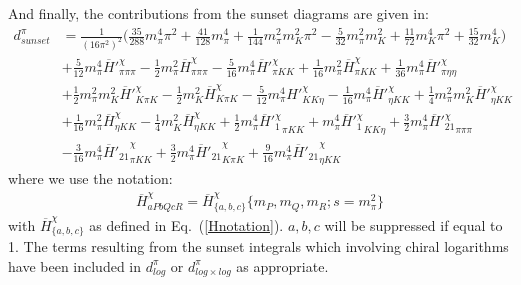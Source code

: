 \documentclass[12pt,a4paper]{article}
\begin{document}
And finally, the contributions from the sunset diagrams are given in:
\begin{align}
	{d}^{\pi}_{sunset} & = \frac{1}{(16\pi^2)^2} \bigg( \frac{35}{288} m_{\pi}^4 \pi^2 + \frac{41}{128} m_{\pi}^4 + \frac{1}{144} m_{\pi}^2 m_{K}^2  \pi^2 - \frac{5}{32} m_{\pi}^2 m_{K}^2 + \frac{11}{72} m_{K}^4 \pi^2 + \frac{15}{32} m_{K}^4 \bigg) \nonumber \\
	& + \frac{5}{12} m_{\pi}^4 \overline{H}'^{\chi}_{\pi \pi \pi} - \frac{1}{2} m_{\pi}^2 \overline{H}^{\chi}_{\pi \pi \pi} - \frac{5}{16} m_{\pi}^4 \overline{H}'^{\chi}_{\pi K K} + \frac{1}{16} m_{\pi}^2 \overline{H}^{\chi}_{\pi K K} + \frac{1}{36} m_{\pi}^4 \overline{H}'^{\chi}_{\pi \eta \eta} \nonumber \\
	& + \frac{1}{2} m_{\pi}^2 m_K^2 \overline{H}'^{\chi}_{K \pi K} - \frac{1}{2} m_{K}^2 \overline{H}^{\chi}_{K \pi K} - \frac{5}{12} m_{\pi}^4 H'^{\chi}_{K K \eta} - \frac{1}{16} m_{\pi}^4 \overline{H}'^{\chi}_{\eta K K} + \frac{1}{4} m_{\pi}^2 m_K^2 \overline{H}'^{\chi}_{\eta K K} \nonumber \\
	& + \frac{1}{16} m_{\pi}^2 \overline{H}^{\chi}_{\eta K K} - \frac{1}{4} m_{K}^2 \overline{H}^{\chi}_{\eta K K} + \frac{1}{2} m_{\pi}^4 {\overline{H}'^{\chi}_{1}}_{\pi K K} + m_{\pi}^4 {\overline{H}'^{\chi}_{1}}_{K K \eta} + \frac{3}{2} m_{\pi}^4 {\overline{H}'^{\chi}_{21}}_{\pi \pi \pi} \nonumber \\
	&  - \frac{3}{16} m_{\pi}^4 {\overline{H}'_{21}}^{\chi}_{\pi K K} + \frac{3}{2} m_{\pi}^4 {\overline{H}'_{21}}^{\chi}_{K \pi K} + \frac{9}{16} m_{\pi}^4 {\overline{H}'_{21}}^{\chi}_{\eta K K}
\end{align}
where we use the notation:
\begin{align}
	\overline{H}^{\chi}_{aP bQ cR} = \overline{H}^{\chi}_{\{a,b,c\}} \{ m_P, m_Q, m_R; s = m_{\pi}^2 \}
\end{align}
with $\overline{H}^{\chi}_{\{a,b,c\}}$ as defined in Eq.~(\ref{Hnotation}).
$a,b,c$ will be suppressed if equal to 1. The terms resulting from the sunset integrals which involving chiral logarithms have been included in  ${d}^{\pi}_{log}$ or ${d}^{\pi}_{log \times log}$ as appropriate.
\end{document}
